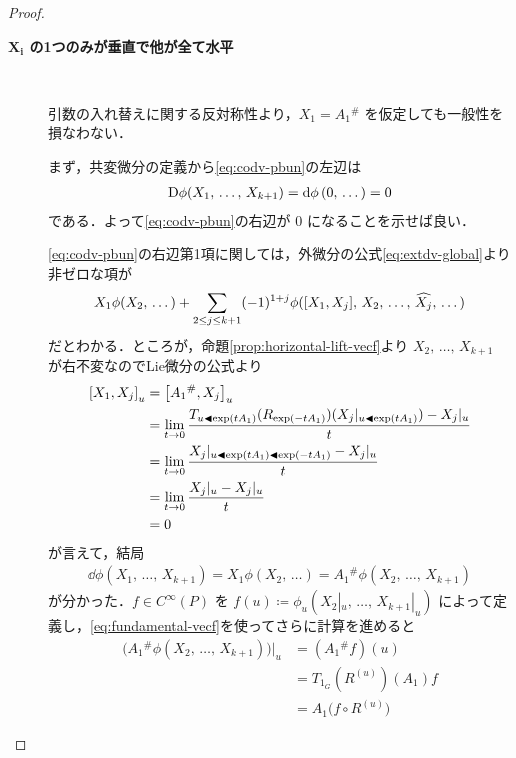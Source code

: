 \documentclass[geometry_main]{subfiles}
\begin{document}
\begin{proof}
\begin{description}
        \item[\textbf{$\bm{X_i}$ の1つのみが垂直で他が全て水平}]　
        
        引数の入れ替えに関する反対称性より，$X_1 = A_1{}^\#$ を仮定しても一般性を損なわない．

        まず，共変微分の定義から\eqref{eq:codv-pbun}の左辺は
        \begin{align}
            \mathrm{D}\phi(X_1,\, \dots,\, X_{k+1}) = \dd{\phi}(0,\, \dots) = 0
        \end{align}
        である．よって\eqref{eq:codv-pbun}の右辺が $0$ になることを示せば良い．
        
        \eqref{eq:codv-pbun}の右辺第1項に関しては，外微分の公式\eqref{eq:extdv-global}より非ゼロな項が
        \begin{align}
            X_1 \phi(X_2,\, \dots) + \sum_{2 \le j \le k+1} (-1)^{1+j} \phi(\comm{X_1}{X_j},\, X_2,\, \dots,\, \widehat{X_j},\, \dots)
        \end{align}
        だとわかる．ところが，命題\ref{prop:horizontal-lift-vecf}より $X_2,\, \dots,\, X_{k+1}$ が右不変なのでLie微分の公式より
        \begin{align}
            \comm{X_1}{X_j}_u
            &= \comm{A_1{}^\#}{X_j}_u \\
            &= \lim_{t\to 0} \frac{T_{u \btl \exp(tA_1)} (R_{\exp (-tA_1)}) (X_j|_{u \btl \exp(tA_1)}) - X_j|_u}{t} \\
            &= \lim_{t\to 0} \frac{X_j|_{u \btl \exp(tA_1) \btl\exp (-tA_1)} - X_j|_u}{t} \\
            &= \lim_{t\to 0} \frac{X_j|_u - X_j|_u}{t} \\
            &= 0
        \end{align}
        が言えて，結局
        \begin{align}
            \dd{\phi}(X_1,\, \dots,\, X_{k+1}) = X_1 \phi(X_2,\, \dots) = A_1{}^\# \phi(X_2,\, \dots,\, X_{k+1})
        \end{align}
        が分かった．$f \in C^\infty (P)$ を $f(u) \coloneqq \phi_u(X_2|_u,\, \dots,\, X_{k+1}|_u)$ によって定義し，\eqref{eq:fundamental-vecf}を使ってさらに計算を進めると
        \begin{align}
            \bigl(A_1{}^\# \phi(X_2,\, \dots,\, X_{k+1})\bigr)|_u
            &= (A_1{}^\# f)(u) \\
            &= T_{1_G} (R^{(u)})(A_1) f \\
            &= A_1 \bigl( f \circ R^{(u)} \bigr)
        \end{align}

\end{description}
\end{proof}
\end{document}
